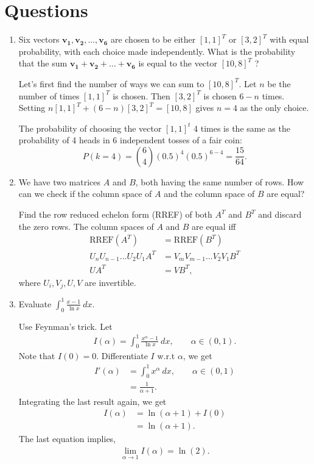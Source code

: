 \documentclass{amsart}
\theoremstyle{plain}
\numberwithin{equation}{section}
\begin{document}
\section*{Questions}
\begin{enumerate}
\item Six vectors $\mathbf{v_1}, \mathbf{v_2}, \ldots, \mathbf{v_6}$ are  chosen
to be either $[1, 1]^T$ or $ [3, 2]^T$ with equal probability, with each choice made independently. What is the probability that the sum $\mathbf{v_1} + \mathbf{v_2} + \ldots + \mathbf{v_6}$ is equal to the vector $[10, 8]^T$
\cite{mat2021}
?

Let's first find the number of ways we can sum to $[10, 8]^T$. Let $n$ be the number of times $[1, 1]^T$ is chosen. Then $[3, 2]^T$ is chosen $6-n$ times. 
Setting $n [1, 1]^T + (6-n) [3, 2]^T = [10, 8]$ gives $n=4$ as the only choice.

The probability of choosing the vector $[1, 1]^t$ 4 times is the same as 
the probability of 4 heads in 6 independent tosses of a fair coin:
$$P(k=4) = \binom{6}{4} (0.5)^4 (0.5)^{6-4} = \frac{15}{64}.$$ 

\item We have two matrices
$A$ and $B$, both having the same number of 
rows. How can we check if the column space of 
$A$ and the column space of $B$ are equal?

Find the row reduced echelon form (RREF) of 
both $A^{T}$ and $B^{T}$ and discard the 
zero rows. The column spaces of 
$A$ and $B$ are equal iff 
\begin{align*}
\mathrm{RREF}(A^{T}) &= \mathrm{RREF}(B^{T})\\
U_n U_{n-1} \ldots U_2 U_1 A^{T} &= 
V_m V_{m-1} \ldots V_2 V_1 B^{T}\\
UA^{T} &= VB^{T},
\end{align*}
where $U_{i}, V_{j}, U, V$ are invertible. 

\item Evaluate $\int_{0}^{1} \frac{x - 1}{\ln x} \:dx.$

Use Feynman's trick. Let 
\begin{align*}
I(\alpha) = \int_{0}^{1} \frac{x^{\alpha} - 1}{\ln x} \:dx,
\qquad \alpha \in (0, 1).
\end{align*}
Note that $I(0) = 0$.  Differentiate $I$ w.r.t $\alpha$, 
we get
\begin{align*}
I'(\alpha) &= \int_{0}^{1} x^{\alpha} \:dx,
\qquad \alpha \in (0, 1)\\
&= \frac{1}{\alpha + 1}.
\end{align*}
Integrating the last result again, we get
\begin{align*}
I(\alpha) &= \ln(\alpha + 1) + I(0)\\
&= \ln(\alpha + 1).
\end{align*}
The last equation implies,
\begin{align*}
\lim_{\alpha \to 1} I(\alpha) = \ln(2).
\end{align*}
 


\end{enumerate}
\end{document}
